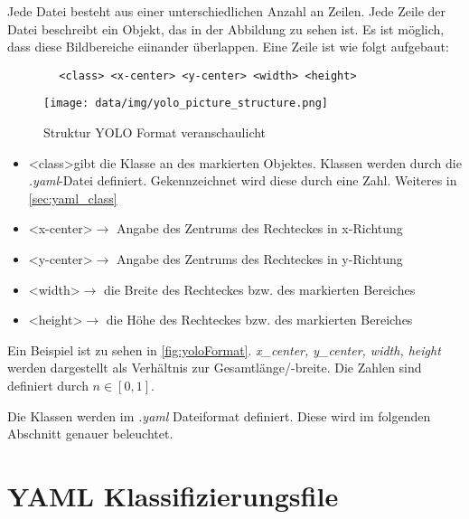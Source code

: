 Jede Datei besteht aus einer unterschiedlichen Anzahl an Zeilen. Jede Zeile der Datei beschreibt ein Objekt, das in der Abbildung zu sehen ist. Es ist möglich, dass diese Bildbereiche eiinander überlappen. Eine Zeile ist wie folgt aufgebaut:
\begin{tcolorbox}
    \begin{verbatim}
        <class> <x-center> <y-center> <width> <height>
    \end{verbatim}
\end{tcolorbox}
\begin{figure}
    \begin{center}
        \texttt{[image: data/img/yolo\_picture\_structure.png]}    
        \caption{Struktur YOLO Format veranschaulicht}
        \label{fig:yoloFormat}
    \end{center}
\end{figure}
\begin{itemize}
    \item \textless class\textgreater gibt die Klasse an des markierten Objektes. Klassen werden durch die \textit{.yaml}-Datei definiert. Gekennzeichnet wird diese durch eine Zahl. Weiteres in \autoref{sec:yaml_class}
    \item \textless x-center\textgreater $\rightarrow$ Angabe des Zentrums des Rechteckes in x-Richtung 
    \item \textless y-center\textgreater $\rightarrow$ Angabe des Zentrums des Rechteckes in y-Richtung 
    \item \textless width\textgreater $\rightarrow$ die Breite des Rechteckes bzw. des markierten Bereiches
    \item \textless height\textgreater $\rightarrow$ die Höhe des Rechteckes bzw. des markierten Bereiches
\end{itemize}
Ein Beispiel ist zu sehen in \autoref{fig:yoloFormat}. \textit{x\_center, y\_center, width, height} werden dargestellt als Verhältnis zur Gesamtlänge/-breite. Die Zahlen sind definiert durch $n\in[0,1]$.

Die Klassen werden im \textit{.yaml} Dateiformat definiert. Diese wird im folgenden Abschnitt genauer beleuchtet.

\section{YAML Klassifizierungsfile}
\label{sec:yaml_class}

